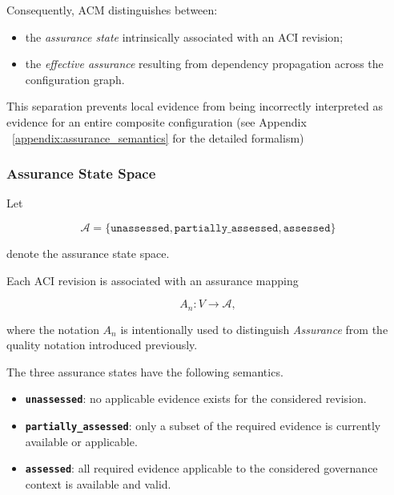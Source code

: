 \documentclass[10pt]{article}
\begin{document}
Consequently, ACM distinguishes between:

\begin{itemize}
    \item the \emph{assurance state} intrinsically associated with an ACI
    revision;
    \item the \emph{effective assurance} resulting from dependency propagation
    across the configuration graph.
\end{itemize}

This separation prevents local evidence from being incorrectly interpreted as
evidence for an entire composite configuration (see Appendix ~\ref{appendix:assurance_semantics} for the detailed formalism)

\subsubsection{Assurance State Space}

Let

\begin{equation}
\mathcal{A}
=
\{
\texttt{unassessed},
\texttt{partially\_assessed},
\texttt{assessed}
\}
\label{eq:assurance_states}
\end{equation}

denote the assurance state space.

Each ACI revision is associated with an assurance mapping

\begin{equation}
A_n :
V
\rightarrow
\mathcal{A},
\label{eq:assurance_mapping}
\end{equation}

where the notation \(A_n\) is intentionally used to distinguish
\emph{Assurance} from the quality notation introduced previously.

The three assurance states have the following semantics.

\begin{itemize}
    \item \textbf{\texttt{unassessed}}: no applicable evidence exists for the
    considered revision.

    \item \textbf{\texttt{partially\_assessed}}: only a subset of the required
    evidence is currently available or applicable.

    \item \textbf{\texttt{assessed}}: all required evidence applicable to the
    considered governance context is available and valid.
\end{itemize}
\end{document}
